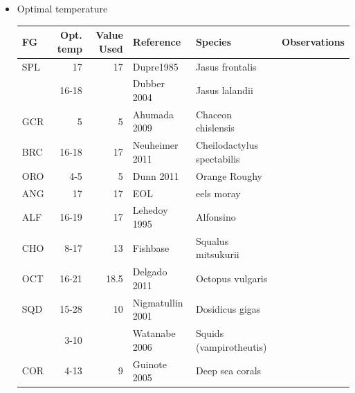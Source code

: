 \documentclass[11pt]{article}
\begin{document}
\begin{itemize}
\item Optimal temperature\\
\label{sec-5-2-1-13-2}%
\begin{center}
\begin{tabular}{lrrlll}
 FG   &    Opt. temp  &  Value Used  &  Reference                   &  Species                     &  Observations                              \\
\hline
 SPL  &           17  &          17  &  Dupre1985                   &  Jasus frontalis             &                                            \\
      &        16-18  &              &  Dubber 2004                 &  Jasus lalandii              &                                            \\
\hline
 GCR  &            5  &           5  &  Ahumada 2009                &  Chaceon chislensis          &                                            \\
\hline
 BRC  &        16-18  &          17  &  Neuheimer 2011              &  Cheilodactylus spectabilis  &                                            \\
\hline
 ORO  &          4-5  &           5  &  Dunn 2011                   &  Orange Roughy               &                                            \\
\hline
 ANG  &           17  &          17  &  EOL                         &  eels moray                  &                                            \\
\hline
 ALF  &        16-19  &          17  &  Lehedoy 1995                &  Alfonsino                   &                                            \\
\hline
 CHO  &         8-17  &          13  &  Fishbase                    &  Squalus mitsukurii          &                                            \\
\hline
 OCT  &        16-21  &        18.5  &  Delgado 2011                &  Octopus vulgaris            &                                            \\
\hline
 SQD  &        15-28  &          10  &  Nigmatullin 2001            &  Dosidicus gigas             &                                            \\
      &         3-10  &              &  Watanabe 2006               &  Squids (vampirotheutis)     &                                            \\
\hline
 COR  &         4-13  &           9  &  Guinote 2005                &  Deep sea corals             &                                            \\

\end{tabular}
\end{center}
\end{itemize}
\end{document}
